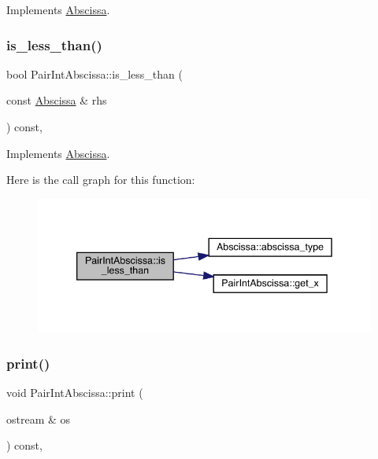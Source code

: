 Implements \mbox{\hyperlink{classAbscissa_a399c2f7a1309368b477c767ff5f63927}{Abscissa}}.

\mbox{\label{classPairIntAbscissa_ab14bfd8eb2b117045417496b68a77c30}} 
\subsubsection{\texorpdfstring{is\_less\_than()}{is\_less\_than()}\hspace{0.1cm}{\footnotesize\ttfamily [2/2]}}
{\footnotesize\ttfamily bool Pair\+Int\+Abscissa\+::is\+\_\+less\+\_\+than (\begin{DoxyParamCaption}\item[{const \mbox{\hyperlink{classAbscissa}{Abscissa}} \&}]{rhs }\end{DoxyParamCaption}) const\hspace{0.3cm}{\ttfamily [inline]}, {\ttfamily [virtual]}}



Implements \mbox{\hyperlink{classAbscissa_a399c2f7a1309368b477c767ff5f63927}{Abscissa}}.

Here is the call graph for this function\+:
\nopagebreak
\begin{figure}[H]
\begin{center}
\leavevmode
\includegraphics[width=339pt]{dc/d86/classPairIntAbscissa_ab14bfd8eb2b117045417496b68a77c30_cgraph}
\end{center}
\end{figure}
\mbox{\label{classPairIntAbscissa_aab7471f83b36cb5a16212902a30d8ce2}} 
\subsubsection{\texorpdfstring{print()}{print()}\hspace{0.1cm}{\footnotesize\ttfamily [1/2]}}
{\footnotesize\ttfamily void Pair\+Int\+Abscissa\+::print (\begin{DoxyParamCaption}\item[{ostream \&}]{os }\end{DoxyParamCaption}) const\hspace{0.3cm}{\ttfamily [inline]}, {\ttfamily [virtual]}}



